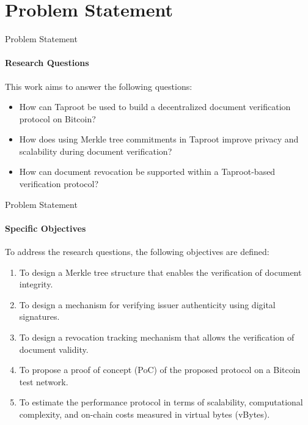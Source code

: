 
\section{Problem Statement}

\begin{frame}{Problem Statement}
\framesubtitle{Research Questions}
This work aims to answer the following questions:
\begin{itemize}
    \item How can Taproot be used to build a decentralized document verification protocol on Bitcoin?
    \item How does using Merkle tree commitments in Taproot improve privacy and scalability during document verification?
    \item How can document revocation be supported within a Taproot-based verification protocol?
\end{itemize}
\end{frame}

\begin{frame}{Problem Statement}
\framesubtitle{Specific Objectives}
To address the research questions, the following objectives are defined:
\begin{enumerate}
    \item To design a Merkle tree structure that enables the verification of document integrity.
    \item To design a mechanism for verifying issuer authenticity using digital signatures.
    \item To design a revocation tracking mechanism that allows the verification of document validity.
    \item To propose a proof of concept (PoC) of the proposed protocol on a Bitcoin test network.
    \item To estimate the performance protocol in terms of scalability, computational complexity, and on-chain costs measured in virtual bytes (vBytes).
\end{enumerate}
\end{frame}
